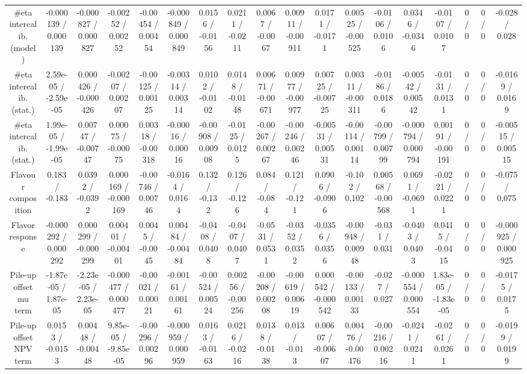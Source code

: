 \documentclass[10pt]{article}
\begin{document}
\begin{table}[htbp]
\begin{center}
\begin{tabular}{|c|c|c|c|c|c|c|c|c|c|c|c|c|c|c|c|c|c|}
  #eta intercalib. (model) & -0.000139 / 0.000139 & -0.000827 / 0.000827 & -0.00252 / 0.00252 & -0.00454 / 0.00454 & -0.000849 / 0.000849 & 0.0156 / -0.0156 & 0.0211 / -0.0211 & 0.0067 / -0.0067 & 0.00911 / -0.00911 & 0.0171 / -0.0171 & 0.00525 / -0.00525 & -0.0106 / 0.0106 & 0.0346 / -0.0346 & -0.0107 / 0.0107 & 0 / 0 & 0 / 0 & -0.028 / 0.028 \\ 
  #eta intercalib. (stat.) & 2.59e-05 / -2.59e-05 & 0.000426 / -0.000426 & -0.00207 / 0.00207 & -0.00125 / 0.00125 & -0.00314 / 0.00314 & 0.0102 / -0.0102 & 0.0148 / -0.0148 & 0.00671 / -0.00671 & 0.00977 / -0.00977 & 0.00725 / -0.00725 & 0.00311 / -0.00311 & -0.0186 / 0.0186 & -0.00542 / 0.00542 & -0.0131 / 0.0131 & 0 / 0 & 0 / 0 & -0.0169 / 0.0169 \\ 
  #eta intercalib. (stat.) & 1.99e-05 / -1.99e-05 & 0.00747 / -0.00747 & 0.00075 / -0.00075 & 0.00318 / -0.00318 & -0.00016 / 0.00016 & -0.00908 / 0.00908 & -0.0125 / 0.0125 & -0.00267 / 0.00267 & -0.00246 / 0.00246 & -0.00531 / 0.00531 & -0.00114 / 0.00114 & -0.00799 / 0.00799 & -0.000794 / 0.000794 & 0.00191 / -0.00191 & 0 / 0 & 0 / 0 & -0.00515 / 0.00515 \\ 
  Flavour composition & 0.183 / -0.183 & 0.0392 / -0.0392 & 0.000169 / -0.000169 & -0.00746 / 0.00746 & -0.0164 / 0.0164 & 0.132 / -0.132 & 0.126 / -0.126 & 0.084 / -0.084 & 0.121 / -0.121 & 0.0906 / -0.0906 & -0.102 / 0.102 & 0.00568 / -0.00568 & 0.0691 / -0.0691 & -0.0221 / 0.0221 & 0 / 0 & 0 / 0 & -0.075 / 0.075 \\ 
  Flavor response & -0.000292 / 0.000292 & 0.000299 / -0.000299 & 0.00401 / -0.00401 & 0.0045 / -0.0045 & 0.00484 / -0.00484 & -0.0408 / 0.0408 & -0.0407 / 0.0407 & -0.0531 / 0.0531 & -0.0352 / 0.0352 & -0.0356 / 0.0356 & -0.00948 / 0.00948 & -0.031 / 0.031 & -0.0403 / 0.0403 & 0.0415 / -0.0415 & 0 / 0 & 0 / 0 & -0.000925 / 0.000925 \\ 
  Pile-up offset mu term & -1.87e-05 / 1.87e-05 & -2.23e-05 / 2.23e-05 & -0.000477 / 0.000477 & -0.00021 / 0.00021 & -0.00161 / 0.00161 & -0.00524 / 0.00524 & 0.00256 / -0.00256 & -0.00208 / 0.00208 & -0.00619 / 0.00619 & 0.000542 / -0.000542 & -0.00133 / 0.00133 & -0.027 / 0.027 & -0.000554 / 0.000554 & 1.83e-05 / -1.83e-05 & 0 / 0 & 0 / 0 & -0.0175 / 0.0175 \\ 
  Pile-up offset NPV term & 0.0153 / -0.0153 & 0.00448 / -0.00448 & 9.85e-05 / -9.85e-05 & -0.00296 / 0.00296 & -0.000959 / 0.000959 & 0.0163 / -0.0163 & 0.0216 / -0.0216 & 0.0138 / -0.0138 & 0.013 / -0.013 & 0.00607 / -0.00607 & 0.00476 / -0.00476 & -0.00216 / 0.00216 & -0.0241 / 0.0241 & -0.0261 / 0.0261 & 0 / 0 & 0 / 0 & -0.0199 / 0.0199 \\ 

\end{tabular}
\end{center}
\end{table}
\end{document}

